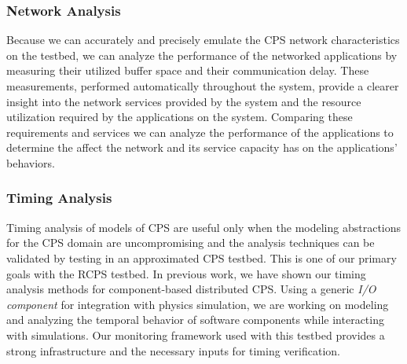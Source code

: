 \subsubsection{Network Analysis}
Because we can accurately and precisely emulate the CPS network characteristics on the testbed, we can analyze the performance of the networked applications by measuring their utilized buffer space and their communication delay.  These measurements, performed automatically throughout the system, provide a clearer insight into the network services provided by the system and the resource utilization required by the applications on the system.  Comparing these requirements and services we can analyze the performance of the applications to determine the affect the network and its service capacity has on the applications' behaviors.  
\subsubsection{Timing Analysis}
Timing analysis of models of CPS are useful only when the modeling abstractions for the CPS domain are uncompromising and the analysis techniques can be validated by testing in an approximated CPS testbed. This is one of our primary goals with the RCPS testbed. In previous work, we have shown our timing analysis methods \cite{MoDeVVa} \cite{SEUS} for component-based distributed CPS. Using a generic \emph{I/O component} for integration with physics simulation, we are working on modeling and analyzing the temporal behavior of software components while interacting with simulations. Our monitoring framework used with this testbed provides a strong infrastructure and the necessary inputs for timing verification.
